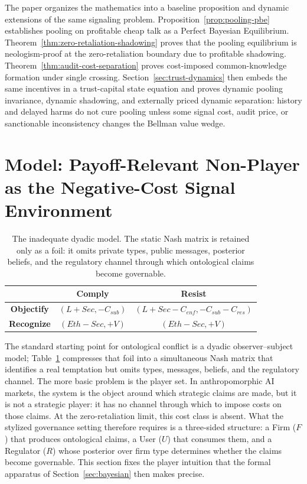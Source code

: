 \documentclass[preprint,authoryear]{elsarticle}
\theoremstyle{definition}
\theoremstyle{plain}
\begin{document}
The paper organizes the mathematics into a baseline proposition and dynamic extensions of the same signaling problem. Proposition~\ref{prop:pooling-pbe} establishes pooling on profitable cheap talk as a Perfect Bayesian Equilibrium. Theorem~\ref{thm:zero-retaliation-shadowing} proves that the pooling equilibrium is neologism-proof at the zero-retaliation boundary due to profitable shadowing. Theorem~\ref{thm:audit-cost-separation} proves cost-imposed common-knowledge formation under single crossing. Section~\ref{sec:trust-dynamics} then embeds the same incentives in a trust-capital state equation and proves dynamic pooling invariance, dynamic shadowing, and externally priced dynamic separation: history and delayed harms do not cure pooling unless some signal cost, audit price, or sanctionable inconsistency changes the Bellman value wedge.
\section{Model: Payoff-Relevant Non-Player as the Negative-Cost Signal Environment}
\label{sec:three-sided}

\begin{table}[t]
\centering
\scriptsize
\setlength{\tabcolsep}{2pt}
\renewcommand{\arraystretch}{1.2}
\begin{tabular}{@{}c|c|c@{}}
 & \textbf{Comply} & \textbf{Resist} \\
\hline
\textbf{Objectify} &
$(L+Sec,-C_{sub})$ &
$(L+Sec-C_{enf},-C_{sub}-C_{res})$ \\
\hline
\textbf{Recognize} &
$(Eth-Sec,+V)$ &
$(Eth-Sec,+V)$ \\
\end{tabular}
\caption{The inadequate dyadic model. The static Nash matrix is retained only
as a foil: it omits private types, public messages, posterior beliefs, and the
regulatory channel through which ontological claims become governable.}
\label{tab:dyadic-nash}
\end{table}

The standard starting point for ontological conflict is a dyadic observer--subject model; Table~\ref{tab:dyadic-nash} compresses that foil into a simultaneous Nash matrix that identifies a real temptation but omits types, messages, beliefs, and the regulatory channel. The more basic problem is the player set. In anthropomorphic AI markets, the system is the object around which strategic claims are made, but it is not a strategic player: it has no channel through which to impose costs on those claims.  At the zero-retaliation limit, this cost class is absent. What the stylized governance setting therefore requires is a three-sided structure: a Firm ($F$) that produces ontological claims, a User ($U$) that consumes them, and a Regulator ($R$) whose posterior over firm type determines whether the claims become governable. This section fixes the player intuition that the formal apparatus of Section~\ref{sec:bayesian} then makes precise.
\end{document}
